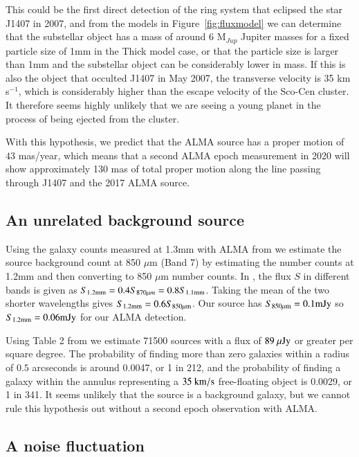 \documentclass{aa} %
\newcommand{\kms}{km s$^{-1}$}
\begin{document}
This could be the first direct detection of the ring system that eclipsed the star J1407 in 2007, and from the models in Figure~\ref{fig:fluxmodel} we can determine that the substellar object has a mass of around 6 M$_{Jup}$ Jupiter masses for a fixed particle size of 1mm in the Thick model case, or that the particle size is larger than 1mm and the substellar object can be considerably lower in mass.
%
If this is also the object that occulted J1407 in May 2007, the transverse velocity is 35 \kms{}, which is considerably higher than the escape velocity of the Sco-Cen cluster.
%
It therefore seems highly unlikely that we are seeing a young planet in the process of being ejected from the cluster.

With this hypothesis, we predict that the ALMA source  has a proper motion of $43$ mas/year, which means that a second ALMA epoch measurement in 2020 will show approximately 130 mas of total proper motion along the line passing through J1407 and the 2017 ALMA source.

\subsection{An unrelated background source} %

Using the galaxy counts measured at 1.3mm with ALMA from \citet{Aravena16} we estimate the source background count at 850 $\mu$m (Band 7) by estimating the number counts at 1.2mm and then converting to 850 $\mu$m number counts.
%
In \citeauthor{Aravena16}, the flux $S$ in different bands is given as $S_{1.2\rm{mm}}=0.4S_{870\mu m}=0.8S_{1.1\rm{mm}}$.
%
Taking the mean of the two shorter wavelengths gives $S_{1.2\rm{mm}}=0.6S_{\rm 850\mu m}$.
% 
Our source has $S_{\rm 850\mu m} =0.1{\rm mJy}$ so $S_{1.2\rm{mm}}=0.06 {\rm mJy}$ for our ALMA detection.

Using Table 2 from \citet{Aravena16} we estimate 71500 sources with a flux of $89\rm{~\mu Jy}$ or greater per square degree.
%
The probability of finding more than zero galaxies within a radius of $0.5$ arcseconds is around 0.0047, or 1 in 212, and the probability of finding a galaxy within the annulus representing a $35\rm{~km/s}$ free-floating object is 0.0029, or 1 in 341.
%
It seems unlikely that the source is a background galaxy, but we cannot rule this hypothesis out without a second epoch observation with ALMA.

\subsection{A noise fluctuation}
\end{document}
